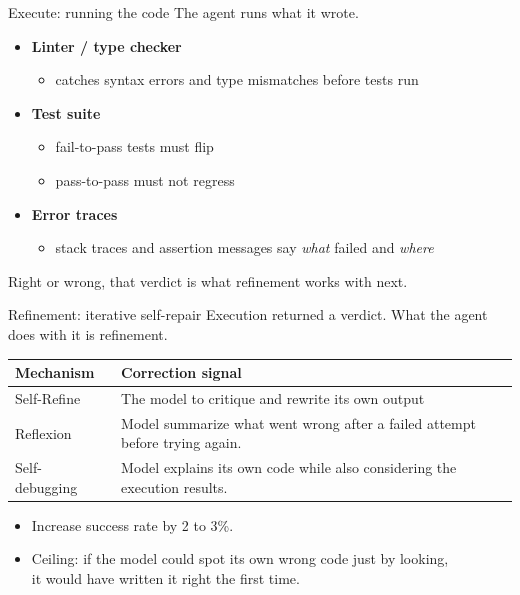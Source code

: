 \documentclass[
  aspectratio=169,
  font=times,
  sectionpage=true,
]{tumbeamer}
\newcommand{\pro}{\item[\textcolor{TUMGreen}{\textbf{+}}]}
\newcommand{\con}{\item[\textcolor{TUMExtRed}{\textbf{--}}]}
\newenvironment{tradeoffs}
  {\small\begin{itemize}\setlength{\itemsep}{0.3em}}
  {\end{itemize}}
\begin{document}
\begin{frame}{Execute: running the code}
  The agent runs what it wrote.

  \medskip
  \begin{itemize}
    \item \textbf{Linter / type checker}
      \begin{itemize}
        \item catches syntax errors and type mismatches before tests run
      \end{itemize}
      \medskip

    \item \textbf{Test suite}
      \begin{itemize}
        \item fail-to-pass tests must flip
        \item pass-to-pass must not regress
      \end{itemize}
      \medskip

    \item \textbf{Error traces}
      \begin{itemize}
        \item stack traces and assertion messages say \emph{what} failed and
          \emph{where}
      \end{itemize}
  \end{itemize}

  \medskip
  {\small Right or wrong, that verdict is what refinement works with next.}
\end{frame}

\begin{frame}{Refinement: iterative self-repair}
  \label{fr:refine1}
  \small
  Execution returned a verdict. What the agent does with it is refinement.

  \medskip
  \begin{tabular}{@{}L{0.30\textwidth}L{0.60\textwidth}@{}}
    \toprule
    \textbf{Mechanism} & \textbf{Correction signal} \\
    \midrule
    Self-Refine~\cite{madaan2023selfrefine}
      & The model to critique and rewrite its own output \\
    \addlinespace
    Reflexion~\cite{shinn2023reflexion}
      & Model summarize what went wrong after a failed attempt before trying again. \\
    \addlinespace
    Self-debugging~\cite{chen2024selfdebug}
      & Model explains its own code while also considering the execution results. \\
    \bottomrule
  \end{tabular}

  \smallskip
  \begin{tradeoffs}
    \pro Increase success rate by 2 to 3\%.
    \con Ceiling: if the model could spot its own wrong code just by looking, 
    \\ it would have written it right the first time.
  \end{tradeoffs}
\end{frame}
\end{document}
